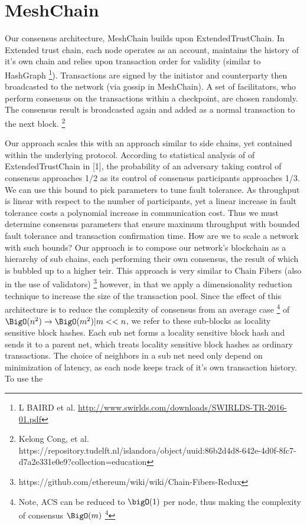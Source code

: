 \documentclass{article}
\begin{document}
\section{MeshChain}
Our consensus architecture, MeshChain builds upon ExtendedTrustChain. In Extended trust chain, each node operates as an account, maintains the history of it's own chain and relies upon transaction order for validity (similar to HashGraph \footnote{ 
L BAIRD et al. \url{http://www.swirlds.com/downloads/SWIRLDS-TR-2016-01.pdf}}). Transactions are signed by the initiator and counterparty then broadcasted to the network (via gossip in MeshChain). A set of facilitators, who perform consensus on the transactions within a checkpoint, are chosen randomly. The consensus result is broadcasted again and added as a normal transaction to the next block. \footnote{Kelong Cong, et al. https://repository.tudelft.nl/islandora/object/uuid:86b2d4d8-642e-4d0f-8fc7-d7a2e331e0e9?collection=education} 

Our approach scales this with an approach similar to side chains, yet contained within the underlying protocol. According to statistical analysis of of ExtendedTrustChain in [1], the probability of an adversary taking control of consensus approaches 1/2 as its control of consensus participants approaches 1/3. We can use this bound to pick parameters to tune fault tolerance. As throughput is linear with respect to the number of participants, yet a linear increase in fault tolerance costs a polynomial increase in communication cost. Thus we must determine consensus parameters that ensure maximum throughput with bounded fault tolerance and transaction confirmation time. How are we to scale a network with such bounds? Our approach is to compose our network's blockchain as a hierarchy of sub chains, each performing their own consensus, the result of which is bubbled up to a higher teir. This approach is very similar to Chain Fibers (also in the use of validators) \footnote{https://github.com/ethereum/wiki/wiki/Chain-Fibers-Redux} however, in that we apply a dimensionality reduction technique to increase the size of the transaction pool. Since the effect of this architecture is to reduce the complexity of consensus from an average case \footnote{Note, ACS can be reduced to $\bigO (1)$ per node, thus making the complexity of consensus $\BigO (m)$ \footnote{"The Honey Badger of BFT Protocols": Andrew Miller et al. \url{https://eprint.iacr.org/2016/199}}} of $\BigO (n^2) \rightarrow \BigO (m^2) | m << n$, we refer to these sub-blocks as locality sensitive block hashes. Each sub net forms a locality sensitive block hash and sends it to a parent net, which treats locality sensitive block hashes as ordinary transactions. The choice of neighbors in a sub net need only depend on minimization of latency, as each node keeps track of it's own transaction history. To use the 
\end{document}
